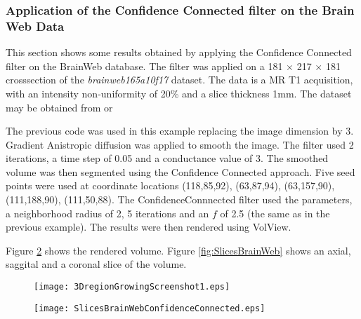 \subsubsection{Application of the Confidence Connected filter on the Brain Web Data}
This section shows some results obtained by applying the Confidence Connected filter on the BrainWeb database. The filter was applied on a 181 $\times$ 217 $\times$ 181 crosssection of the {\it brainweb165a10f17} dataset. The data is a MR T1 acquisition, with an intensity non-uniformity of 20\% and a slice thickness 1mm. The dataset may be obtained from 
 or 

The previous code was used in this example replacing the image dimension by 3. 
Gradient Anistropic diffusion was applied to smooth the image. The filter used 2 iterations, a time step of 0.05 and a conductance value of 3. The smoothed volume was then segmented using the Confidence Connected approach. Five seed points were used at coordinate locations (118,85,92), (63,87,94), (63,157,90), (111,188,90), (111,50,88). The ConfidenceConnnected filter used the parameters, a neighborhood radius of 2, 5 iterations and an $f$ of 2.5 (the same as in the previous example). The results were then rendered using VolView. 

Figure \ref{fig:3DregionGrowingScreenshot1} shows the rendered volume. Figure \ref{fig:SlicesBrainWeb} shows an axial, saggital and a coronal slice of the volume. 

\begin{figure}
\center
\texttt{[image: 3DregionGrowingScreenshot1.eps]}
\label{fig:3DregionGrowingScreenshot1}
\end{figure}

\begin{figure}
\center
\texttt{[image: SlicesBrainWebConfidenceConnected.eps]}
\label{fig:3DregionGrowingScreenshot1}
\end{figure}


